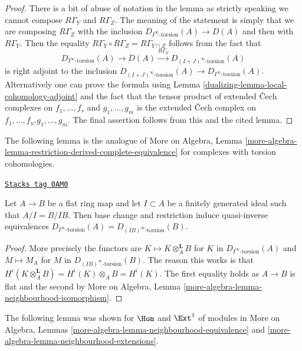 \begin{proof}

There is a bit of abuse of notation in the lemma as strictly
speaking we cannot compose $R\Gamma_Y$ and $R\Gamma_Z$. The
meaning of the statement is simply that we are composing
$R\Gamma_Z$ with the inclusion $D_{I^\infty\text{-torsion}}(A) \to D(A)$
and then with $R\Gamma_Y$. Then the equality
$R\Gamma_Y \circ R\Gamma_Z = R\Gamma_{Y \cap Z}$
follows from the fact that
$$
D_{I^\infty\text{-torsion}}(A) \to D(A) \xrightarrow{R\Gamma_Y}
D_{(I + J)^\infty\text{-torsion}}(A)
$$
is right adjoint to the inclusion
$D_{(I + J)^\infty\text{-torsion}}(A) \to D_{I^\infty\text{-torsion}}(A)$.
Alternatively one can prove the formula using
Lemma \ref{dualizing-lemma-local-cohomology-adjoint}
and the fact that the tensor product of
extended {\v C}ech complexes on $f_1, \ldots, f_r$ and
$g_1, \ldots, g_m$ is the extended {\v C}ech complex on
$f_1, \ldots, f_n. g_1, \ldots, g_m$.
The final assertion follows from this and the cited lemma.
\end{proof}

The following lemma is the analogue of
More on Algebra, Lemma
\ref{more-algebra-lemma-restriction-derived-complete-equivalence}
for complexes with torsion cohomologies.

\begin{lemma}
\label{dualizing-lemma-torsion-flat-change-rings}
\href{https://stacks.math.columbia.edu/tag/0AM0}{\texttt{Stacks tag 0AM0}}

Let $A \to B$ be a flat ring map and let $I \subset A$ be a finitely
generated ideal such that $A/I = B/IB$. Then base change and
restriction induce quasi-inverse equivalences
$D_{I^\infty\text{-torsion}}(A) = D_{(IB)^\infty\text{-torsion}}(B)$.
\end{lemma}

\begin{proof}
More precisely the functors are $K \mapsto K \otimes_A^\mathbf{L} B$
for $K$ in $D_{I^\infty\text{-torsion}}(A)$ and $M \mapsto M_A$
for $M$ in $D_{(IB)^\infty\text{-torsion}}(B)$. The reason this works
is that $H^i(K \otimes_A^\mathbf{L} B) = H^i(K) \otimes_A B = H^i(K)$.
The first equality holds as $A \to B$ is flat and the second by
More on Algebra, Lemma \ref{more-algebra-lemma-neighbourhood-isomorphism}.
\end{proof}

The following lemma was shown for $\Hom$ and $\Ext^1$ of modules in
More on Algebra, Lemmas \ref{more-algebra-lemma-neighbourhood-equivalence} and
\ref{more-algebra-lemma-neighbourhood-extensions}.

